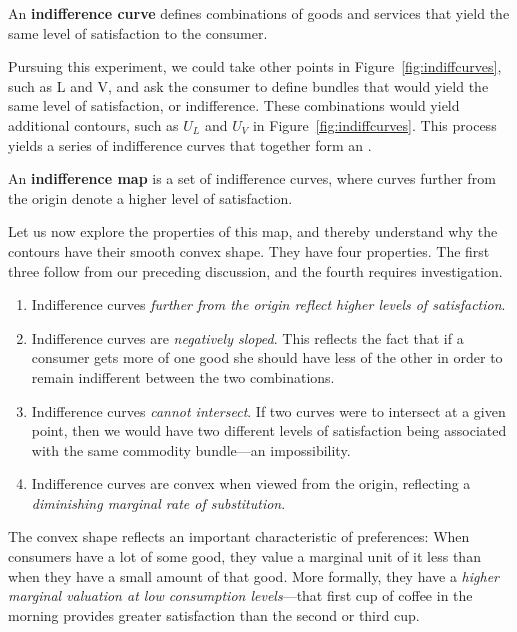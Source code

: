

\newhtmlpage

\begin{DefBox}
	An \textbf{indifference curve} defines combinations of goods and services that yield the same level of satisfaction to the consumer.
\end{DefBox}

Pursuing this experiment, we could take other points in Figure~\ref{fig:indiffcurves},
such as L and V, and ask the consumer to define bundles
that would yield the same level of satisfaction, or indifference. These
combinations would yield additional contours, such as $U_L$ and $U_V$ in
Figure~\ref{fig:indiffcurves}. This process yields a series of indifference
curves that together form an .

\begin{DefBox}
	An \textbf{indifference map} is a set of indifference curves, where curves further from the origin denote a higher level of satisfaction.
\end{DefBox}

Let us now explore the properties of this map, and thereby understand why
the contours have their smooth convex shape. They have four properties. The
first three follow from our preceding discussion, and the fourth requires
investigation.

\begin{enumerate}
	\item Indifference curves \textit{further from the origin reflect higher
		levels of satisfaction}.
	
	\item Indifference curves are \textit{negatively sloped}. This reflects the
	fact that if a consumer gets more of one good she should have less of the
	other in order to remain indifferent between the two combinations.
	
	\item Indifference curves \textit{cannot intersect}. If two curves were to
	intersect at a given point, then we would have two different levels of
	satisfaction being associated with the same commodity bundle---an
	impossibility.
	
	\item Indifference curves are convex when viewed from the origin, reflecting
	a \textit{diminishing marginal rate of substitution}.
\end{enumerate}

The convex shape reflects an important characteristic of preferences: When
consumers have a lot of some good, they value a marginal unit of it less
than when they have a small amount of that good. More formally, they have a 
\textit{higher marginal valuation at low consumption levels}---that first
cup of coffee in the morning provides greater satisfaction than the second
or third cup.

